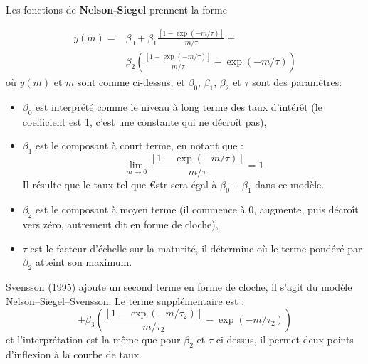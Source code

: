 \begin{f}


Les fonctions de \textbf{Nelson-Siegel}  prennent la forme

{\small\begin{align*}
y( m ) =& \beta _0 + \beta _1\frac{{\left[ {1 - \exp \left( { - m/\tau} \right)} \right]}}{m/\tau} + \\
		&\beta _2 {\left(\frac{{\left[ {1 - \exp \left( { - m/\tau} \right)} \right]}}{m/\tau} - \exp \left( { - m/\tau}\right)\right)}
\label{MTNSeq}
\end{align*}}
%
où \(y\left( m \right)\) et \(m\) sont comme ci-dessus, et \(\beta _0\), \(\beta_1\), \(\beta_2\) et \(\tau\) sont des paramètres:


\begin{itemize}

\item   \(\beta_0\) est interprété comme le niveau à long terme des taux d'intérêt (le coefficient est 1, c'est une constante qui ne décroît pas),

\item   \(\beta_1\) est le composant à court terme, en notant que :
\begin{equation*}
	\lim_{m \rightarrow 0} \frac{{\left[ {1 - \exp \left( { - m/\tau} \right)} \right]}}{m/\tau}=1
\end{equation*}
Il résulte que le taux  tel que €str sera égal à  \(\beta_0+\beta_1\) dans ce modèle.
\item   \(\beta_2\) est le composant à moyen terme (il commence à 0, augmente, puis décroît vers zéro, autrement dit en forme de cloche),
\item   \(\tau\) est le facteur d'échelle sur la maturité, il détermine où le terme pondéré par \(\beta_2\) atteint son maximum. 
\end{itemize}

Svensson (1995) ajoute un second terme en forme de cloche, il s'agit du modèle Nelson–Siegel–Svensson. Le terme supplémentaire est :
%
\begin{equation*}
+\beta _3 {\left(\frac{{\left[ {1 - \exp \left( { - m/\tau_2} \right)} \right]}}{m/\tau_2} - \exp \left( { - m/\tau_2}\right)\right)}
\label{MTSveq}
\end{equation*}
et l'interprétation est la même que pour \(\beta_2\) et \(\tau\) ci-dessus, il permet deux points d'inflexion à la courbe de taux.


\end{f}
